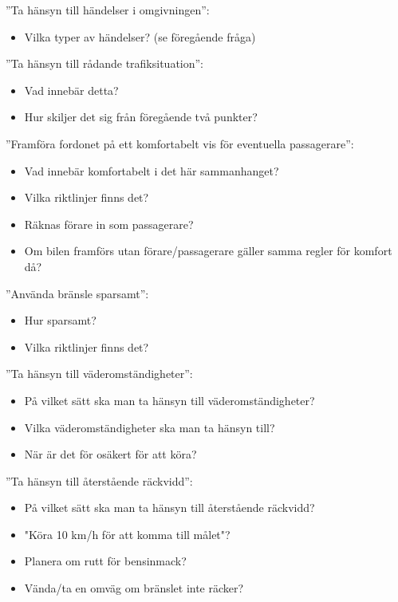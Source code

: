 \documentclass[10pt]{article}
\begin{document}
\noindent ”Ta hänsyn till händelser i omgivningen”:
\begin{itemize}
\item Vilka typer av händelser? (se föregående fråga)
\end{itemize}
\hfill \break

\noindent ”Ta hänsyn till rådande trafiksituation”:
\begin{itemize}
\item Vad innebär detta?
\item Hur skiljer det sig från föregående två punkter?
\end{itemize}
\hfill \break

\noindent ”Framföra fordonet på ett komfortabelt vis för eventuella passagerare”:
\begin{itemize}
\item Vad innebär komfortabelt i det här sammanhanget? 
\item Vilka riktlinjer finns det?
\item Räknas förare in som passagerare?
\item Om bilen framförs utan förare/passagerare gäller samma regler för komfort då?
\end{itemize}
\hfill \break

\noindent ”Använda bränsle sparsamt”:
\begin{itemize}
\item Hur sparsamt? 
\item Vilka riktlinjer finns det?
\end{itemize}
\hfill \break

\noindent ”Ta hänsyn till väderomständigheter”:
\begin{itemize}
\item På vilket sätt ska man ta hänsyn till väderomständigheter?
\item Vilka väderomständigheter ska man ta hänsyn till?
\item När är det för osäkert för att köra?
\end{itemize}
\hfill \break

\noindent ”Ta hänsyn till återstående räckvidd”:
\begin{itemize}
\item På vilket sätt ska man ta hänsyn till återstående räckvidd?
\item "Köra 10 km/h för att komma till målet"?
\item Planera om rutt för bensinmack?
\item Vända/ta en omväg om bränslet inte räcker?
\end{itemize}
\hfill \break
\end{document}
